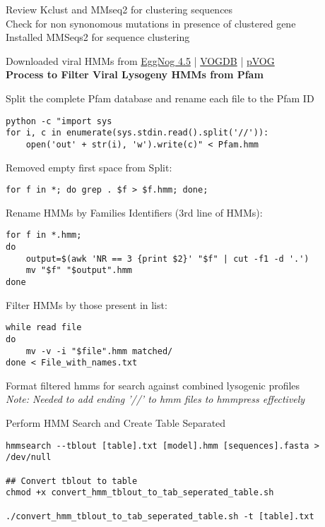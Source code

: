 \documentclass[idxtotoc,hyperref,openany,oneside]{labbook} %
\begin{document}
Review Kclust and MMseq2 for clustering sequences \\

Check for non synonomous mutations in presence of clustered gene \\

Installed MMSeqs2 for sequence clustering

Downloaded viral HMMs from \href{http://eggnogdb.embl.de/#/app/viruses}{EggNog 4.5}  |  \href{http://vogdb.org/download}{VOGDB}  | \href{http://dmk-brain.ecn.uiowa.edu/pVOGs/downloads.html}{pVOG} \\

\textbf{Process to Filter Viral Lysogeny HMMs from Pfam}

Split the complete Pfam database and rename each file to the Pfam ID 

\begin{verbatim}
python -c "import sys
for i, c in enumerate(sys.stdin.read().split('//')):
    open('out' + str(i), 'w').write(c)" < Pfam.hmm
\end{verbatim}

Removed empty first space from Split:
\begin{verbatim}
for f in *; do grep . $f > $f.hmm; done;
\end{verbatim}

Rename HMMs by Families Identifiers (3rd line of HMMs):
\begin{verbatim}
for f in *.hmm; 
do 
	output=$(awk 'NR == 3 {print $2}' "$f" | cut -f1 -d '.')
	mv "$f" "$output".hmm
done
\end{verbatim}

Filter HMMs by those present in list:
\begin{verbatim}
while read file
do
	mv -v -i "$file".hmm matched/
done < File_with_names.txt
\end{verbatim}

Format filtered hmms for search against combined lysogenic profiles \\
\textit{Note: Needed to add ending '//' to hmm files to hmmpress effectively}

Perform HMM Search and Create Table Separated
\begin{verbatim}
hmmsearch --tblout [table].txt [model].hmm [sequences].fasta > /dev/null

## Convert tblout to table
chmod +x convert_hmm_tblout_to_tab_seperated_table.sh

./convert_hmm_tblout_to_tab_seperated_table.sh -t [table].txt 
\end{verbatim}
\end{document}
